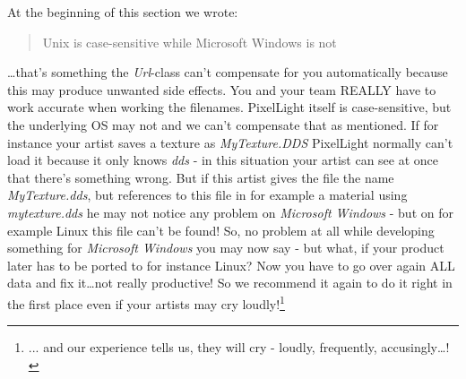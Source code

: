 At the beginning of this section we wrote: \begin{quote}Unix is case-sensitive while Microsoft Windows is not\end{quote}\ldots that's something the \emph{Url}-class can't compensate for you automatically because this may produce unwanted side effects. You and your team REALLY have to work accurate when working the filenames. PixelLight itself is case-sensitive, but the underlying OS may not and we can't compensate that as mentioned. If for instance your artist saves a texture as \emph{MyTexture.DDS} PixelLight normally can't load it because it only knows \emph{dds} - in this situation your artist can see at once that there's something wrong. But if this artist gives the file the name \emph{MyTexture.dds}, but references to this file in for example a material using \emph{mytexture.dds} he may not notice any problem on \emph{Microsoft Windows} - but on for example Linux this file can't be found! So, no problem at all while developing something for \emph{Microsoft Windows} you may now say - but what, if your product later has to be ported to for instance Linux? Now you have to go over again ALL data and fix it\ldots not really productive! So we recommend it again to do it right in the first place even if your artists may cry loudly!\footnote{... and our experience tells us, they will cry - loudly, frequently, accusingly\ldots !}
